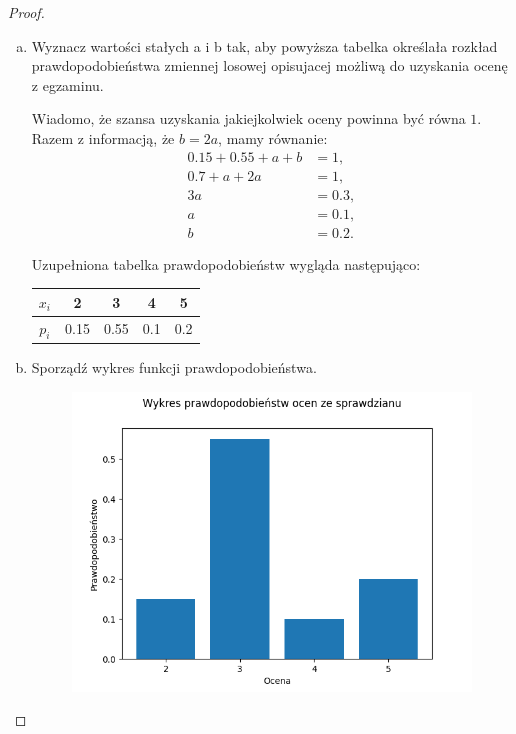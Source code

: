 \documentclass[11pt]{article}
\theoremstyle{definition}
\numberwithin{zadanie}{section}
\begin{document}
\begin{proof}

    \begin{enumerate}[a)]
        \item  Wyznacz wartości stałych a i b tak, aby powyższa tabelka określała rozkład prawdopodobieństwa zmiennej losowej opisujacej możliwą do uzyskania ocenę z egzaminu.

              Wiadomo, że szansa uzyskania jakiejkolwiek oceny powinna być równa $1$. Razem z informacją, że $b=2a$, mamy równanie:
              \begin{align*}
                  0.15+0.55+a+b & = 1,   \\
                  0.7+a+2a      & = 1,   \\
                  3a            & = 0.3, \\
                  a             & = 0.1, \\
                  b             & = 0.2.
              \end{align*}

              Uzupełniona tabelka prawdopodobieństw wygląda następująco:

              \begin{center}
                  \begin{tabular}{ |c|c|c|c|c| }
                      \hline
                      $x_i$ & 2    & 3    & 4   & 5   \\
                      \hline
                      $p_i$ & 0.15 & 0.55 & 0.1 & 0.2 \\
                      \hline
                  \end{tabular}
              \end{center}

        \item Sporządź wykres funkcji prawdopodobieństwa.

              \begin{figure}[H]
                  \centering
                  \includegraphics[width=0.5\linewidth]{oceny.png}
              \end{figure}


\end{enumerate}
\end{proof}
\end{document}
